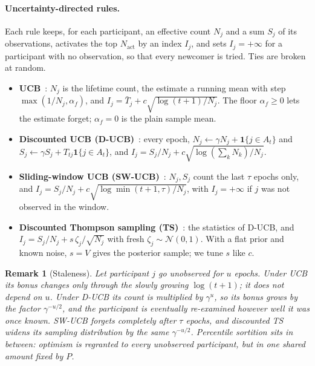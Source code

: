 \documentclass[sigconf,anonymous,review,nonacm]{acmart}
\newtheorem{remark}{Remark}
\begin{document}
\paragraph{Uncertainty-directed rules.} Each rule keeps, for each participant, an effective
count $N_j$ and a sum $S_j$ of its observations, activates the top $N_{\mathrm{act}}$ by an
index $I_j$, and sets $I_j=+\infty$ for a participant with no observation, so that every
newcomer is tried. Ties are broken at random.
\begin{itemize}
\item \textbf{UCB}~\cite{auer2002finite}: $N_j$ is the lifetime count, the estimate a running
mean with step $\max(1/N_j,\alpha_f)$, and $I_j=\bar T_j+c\sqrt{\log(t+1)/N_j}$. The floor
$\alpha_f\ge0$ lets the estimate forget; $\alpha_f=0$ is the plain sample mean.
\item \textbf{Discounted UCB (D-UCB)}~\cite{garivier2011switching}: every epoch,
$N_j\leftarrow\gamma N_j+\mathbf 1\{j\in A_t\}$ and $S_j\leftarrow\gamma S_j+T_{tj}\mathbf
1\{j\in A_t\}$, and $I_j=S_j/N_j+c\sqrt{\log(\sum_k N_k)/N_j}$.
\item \textbf{Sliding-window UCB (SW-UCB)}~\cite{garivier2011switching}: $N_j,S_j$ count the
last $\tau$ epochs only, and $I_j=S_j/N_j+c\sqrt{\log\min(t+1,\tau)/N_j}$, with
$I_j=+\infty$ if $j$ was not observed in the window.
\item \textbf{Discounted Thompson sampling (TS)}~\cite{agrawal2012thompson,raj2017taming}:
the statistics of D-UCB, and $I_j=S_j/N_j+s\,\zeta_j/\sqrt{N_j}$ with fresh
$\zeta_j\sim\mathcal N(0,1)$. With a flat prior and known noise, $s=V$ gives the posterior
sample; we tune $s$ like $c$.
\end{itemize}

\begin{remark}[Staleness]\label{rem:stale}
Let participant $j$ go unobserved for $u$ epochs. Under UCB its bonus changes only through
the slowly growing $\log(t+1)$; it does not depend on $u$. Under D-UCB its count is
multiplied by $\gamma^{u}$, so its bonus grows by the factor $\gamma^{-u/2}$, and the
participant is eventually re-examined however well it was once known. SW-UCB forgets
completely after $\tau$ epochs, and discounted TS widens its sampling distribution by the
same $\gamma^{-u/2}$. Percentile sortition sits in between: optimism is regranted to every
unobserved participant, but in one shared amount fixed by $P$.
\end{remark}

\end{document}
